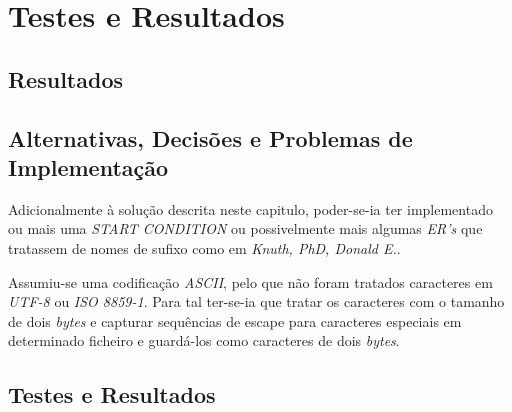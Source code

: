 \section{Testes e Resultados}
\subsection{Resultados}
\label{sec:ts:b1}

\subsection{Alternativas, Decisões e Problemas de Implementação}

Adicionalmente à solução descrita neste capitulo, poder-se-ia ter implementado
ou mais uma \emph{START CONDITION} ou possivelmente mais algumas \emph{ER's}
que tratassem de nomes de sufixo como em  \emph{Knuth, PhD, Donald E.}.

Assumiu-se uma codificação \emph{ASCII}, pelo que não foram tratados caracteres
em \emph{UTF-8} ou \emph{ISO 8859-1}. Para tal ter-se-ia que tratar os
caracteres com o tamanho de dois \emph{bytes} e capturar sequências de escape
para caracteres especiais em determinado ficheiro  e guardá-los
como caracteres de dois \emph{bytes}. 

\subsection{Testes e Resultados}

